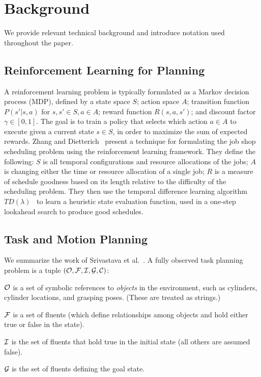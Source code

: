 \section{Background}
We provide relevant technical background and introduce notation
used throughout the paper.

\subsection{Reinforcement Learning for Planning}
A reinforcement learning problem is typically formulated as
a Markov decision process (MDP), defined by a state space
$S$; action space $A$; transition function $P(s' | s, a)$ for $s, s' \in S, a \in A$;
reward function $R(s, a, s')$; and discount factor $\gamma \in [0, 1]$. The goal
is to train a policy that selects which action $a \in A$ to execute given a current
state $s \in S$, in order to maximize the sum of expected rewards. Zhang
and Dietterich~\cite{JobShopSched} present a technique for formulating the job shop scheduling
problem using the reinforcement learning framework. They define the following:
$S$ is all temporal configurations and resource allocations of the jobs; $A$ is changing
either the time or resource allocation of a single job; $R$ is a measure of schedule
goodness based on its length relative to the difficulty of the scheduling problem.
They then use the temporal difference learning algorithm $TD(\lambda)$~\cite{suttonbarto}
to learn a heuristic state evaluation function, used in a one-step lookahead search
to produce good schedules.

\subsection{Task and Motion Planning}
We summarize the work of Srivastava et al.~\cite{srivastava2014combined}. A fully observed task planning
problem is a tuple $(\mathcal{O}, \mathcal{F}, \mathcal{I}, \mathcal{G}, \mathcal{C})$:

$\mathcal{O}$ is a set of symbolic references to \emph{objects} in the environment,
such as cylinders, cylinder locations, and grasping poses. (These are treated as strings.)

$\mathcal{F}$ is a set of fluents (which define relationships among objects and hold either
true or false in the state).

$\mathcal{I}$ is the set of fluents that hold true in the initial state
(all others are assumed false).

$\mathcal{G}$ is the set of fluents defining the goal state.


